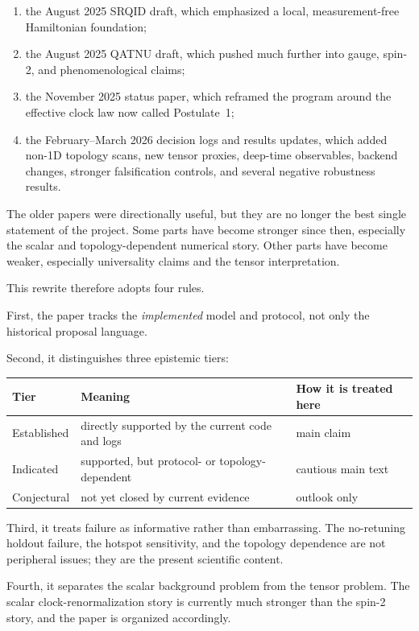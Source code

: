 \documentclass[11pt]{article}
\begin{document}
\begin{enumerate}
    \item the August 2025 SRQID draft, which emphasized a local, measurement-free Hamiltonian foundation;
    \item the August 2025 QATNU draft, which pushed much further into gauge, spin-2, and phenomenological claims;
    \item the November 2025 status paper, which reframed the program around the effective clock law now called Postulate~1;
    \item the February--March 2026 decision logs and results updates, which added non-1D topology scans, new tensor proxies, deep-time observables, backend changes, stronger falsification controls, and several negative robustness results.
\end{enumerate}

The older papers were directionally useful, but they are no longer the best single statement of the project. Some parts have become stronger since then, especially the scalar and topology-dependent numerical story. Other parts have become weaker, especially universality claims and the tensor interpretation.

This rewrite therefore adopts four rules.

First, the paper tracks the \emph{implemented} model and protocol, not only the historical proposal language.

Second, it distinguishes three epistemic tiers:
\begin{center}
\begin{tabular}{@{}lll@{}}
\toprule
Tier & Meaning & How it is treated here \\
\midrule
Established & directly supported by the current code and logs & main claim \\
Indicated & supported, but protocol- or topology-dependent & cautious main text \\
Conjectural & not yet closed by current evidence & outlook only \\
\bottomrule
\end{tabular}
\end{center}

Third, it treats failure as informative rather than embarrassing. The no-retuning holdout failure, the hotspot sensitivity, and the topology dependence are not peripheral issues; they are the present scientific content.

Fourth, it separates the scalar background problem from the tensor problem. The scalar clock-renormalization story is currently much stronger than the spin-2 story, and the paper is organized accordingly.
\end{document}
